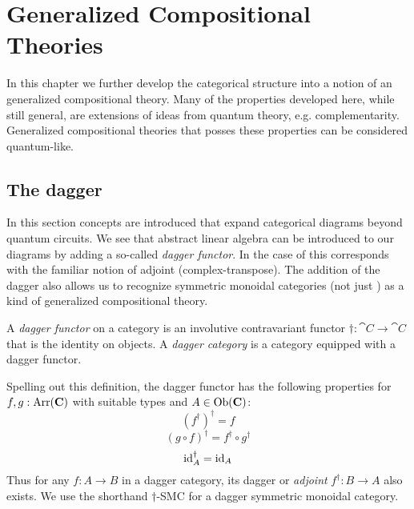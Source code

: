 \chapter{Generalized Compositional Theories}
\label{chap:cqm}

\todo{\chapabstract{}}

In this chapter we further develop the categorical structure into a notion of an generalized compositional theory. Many of the properties developed here, while still general, are extensions of ideas from quantum theory, e.g. complementarity.  Generalized compositional theories that posses these properties can be considered quantum-like.

\section{The dagger}
In this section concepts are introduced that expand categorical diagrams beyond quantum circuits. We see that abstract linear algebra can be introduced to our diagrams by adding a so-called \emph{dagger functor}.  In the case of  this corresponds with the familiar notion of adjoint (complex-transpose).  The addition of the dagger also allows us to recognize symmetric monoidal categories (not just ) as a kind of generalized compositional theory. 

\begin{defn}
\label{defn:dagger}
A \emph{dagger functor} on a category  is an involutive contravariant functor $\dagger:\cat{C}\to\cat{C}$ that is the identity on objects. A \emph{dagger category} is a category equipped with a dagger functor.
\end{defn}
Spelling out this definition, the dagger functor has the following properties for $f,g:\mbox{Arr}(\mathbf{C})$ with suitable types and $A\in\mbox{Ob}(\mathbf{C})$:
\begin{equation}
\left(f^{\dagger}\right)^{\dagger} = f 
\end{equation}
\begin{equation}
(g\circ f)^{\dagger} = f^{\dagger}\circ g^{\dagger}
\end{equation}
\begin{equation}
\mbox{id}_{A}^{\dagger} = \mbox{id}_{A}
\end{equation}
Thus for any $f:A\to B$ in a dagger category, its dagger or \emph{adjoint} $f^{\dagger}:B\to A$ also exists. We use the shorthand $\dagger$-SMC for a dagger symmetric monoidal category.

